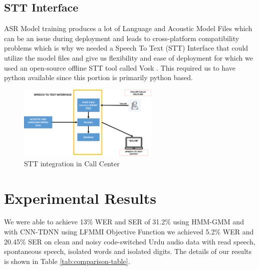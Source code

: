 \documentclass[a4paper, 11pt]{article}
\begin{document}


\subsection{STT Interface}
ASR Model training produces a lot of Language and Acoustic Model Files which can be an issue during deployment and leads to cross-platform compatibility problems which is why we needed a Speech To Text (STT) Interface that could utilize the model files and give us flexibility and ease of deployment for which we used an open-source offline STT tool called Vosk \cite{alphacep_vosk_2022}. This required us to have python available since this portion is primarily python based.


\begin{figure}[h]
    \centering
    \includegraphics[width=0.6\textwidth]{img/STT2.png}
    \caption{STT integration in Call Center}
    \label{fig:STT-working}
\end{figure}   


\section{Experimental Results}
\label{sec:experimental-results}
We were able to achieve 13\% WER and SER of 31.2\% using HMM-GMM and with CNN-TDNN using LFMMI Objective Function we achieved 5.2\% WER and 20.45\% SER on clean and noisy code-switched Urdu audio data with read speech, spontaneous speech, isolated words and isolated digits. The details of our results is shown in Table \ref{tab:comparison-table}. 
\end{document}
